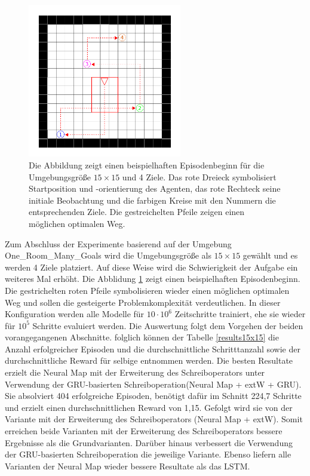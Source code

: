 \begin{figure}[ht!]
  \centering
  \includegraphics[keepaspectratio,width=0.6\textwidth]{abbildungen/15x15_ep_start.pdf}
  \caption{Die Abbildung zeigt einen beispielhaften Episodenbeginn für die Umgebungsgröße $15 \times 15$ und 4 Ziele. Das rote Dreieck symbolisiert Startposition und -orientierung des Agenten, das rote Rechteck seine initiale Beobachtung und die farbigen Kreise mit den Nummern die entsprechenden Ziele. Die gestreichelten Pfeile zeigen einen möglichen optimalen Weg.}
  \label{fig_15x15_ep_start}
\end{figure}

Zum Abschluss der Experimente basierend auf der Umgebung \glqq One\_Room\_Many\_Goals\grqq{} wird die Umgebungsgröße als $15 \times 15$ gewählt und es werden 4 Ziele platziert. Auf diese Weise wird die Schwierigkeit der Aufgabe ein weiteres Mal erhöht. Die Abblidung \ref{fig_15x15_ep_start} zeigt einen beispielhaften Episodenbeginn. Die gestrichelten roten Pfeile symbolisieren wieder einen möglichen optimalen Weg und sollen die gesteigerte Problemkomplexität verdeutlichen. In dieser Konfiguration werden alle Modelle für $10\cdot10^6$ Zeitschritte trainiert, ehe sie wieder für $10^5$ Schritte evaluiert werden. Die Auswertung folgt dem Vorgehen der beiden vorangegangenen Abschnitte. folglich können der Tabelle \ref{results15x15} die Anzahl erfolgreicher Episoden und die durchschnittliche Schritttanzahl sowie der durchschnittliche Reward für selbige entnommen werden. Die besten Resultate erzielt die Neural Map mit der Erweiterung des Schreiboperators unter Verwendung der GRU-basierten Schreiboperation(Neural Map + extW + GRU). Sie absolviert 404 erfolgreiche Episoden, benötigt dafür im Schnitt 224,7 Schritte und erzielt einen durchschnittlichen Reward von 1,15. Gefolgt wird sie von der Variante mit der Erweiterung des Schreiboperators (Neural Map + extW). Somit erreichen beide Varianten mit der Erweiterung des Schreiboperators bessere Ergebnisse als die Grundvarianten. Darüber hinaus verbessert die Verwendung der GRU-basierten Schreiboperation die jeweilige Variante. Ebenso liefern alle Varianten der Neural Map wieder bessere Resultate als das LSTM.

